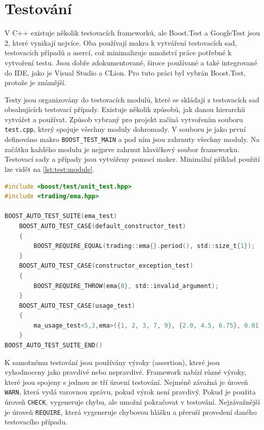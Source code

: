 \chapter{Testování}
V C++ existuje několik testovacích frameworků, ale Boost.Test a GoogleTest jsou 2, které vynikají nejvíce.
Oba používají makra k vytváření testovacích sad, testovacích případů a asercí, což minimalizuje množství práce potřebné k vytvoření testu.
Jsou dobře zdokumentované, široce používané a také integrované do IDE, jako je Visual Studio a CLion.
Pro tuto práci byl vybrán Boost.Test, protože je známější.

Testy jsou organizovány do testovacích modulů, které se skládají z testovacích sad obsahujících testovací případy.
Existuje několik způsobů, jak danou hierarchii vytvářet a používat.
Způsob vybraný pro projekt začíná vytvořením souboru \texttt{test.cpp}, který spojuje všechny moduly dohromady.
V souboru je jako první definováno makro \texttt{BOOST\_TEST\_MAIN} a pod ním jsou zahrnuty všechny moduly.
Na začátku každého modulu je nejprve zahrnut hlavičkový soubor frameworku.
Testovací sady a případy jsou vytvářeny pomocí maker.
Minimální příklad použití lze vidět na \ref{lst:test:module}.

\begin{lstlisting}[caption={~Ukázka testovacího modulu},label={lst:test:module},captionpos=t,abovecaptionskip=-\medskipamount,belowcaptionskip=\medskipamount,language=C]
#include <boost/test/unit_test.hpp>
#include <trading/ema.hpp>

BOOST_AUTO_TEST_SUITE(ema_test)
    BOOST_AUTO_TEST_CASE(default_constructor_test)
    {
        BOOST_REQUIRE_EQUAL(trading::ema{}.period(), std::size_t{1});
    }
    BOOST_AUTO_TEST_CASE(constructor_exception_test)
    {
        BOOST_REQUIRE_THROW(ema{0}, std::invalid_argument);
    }
    BOOST_AUTO_TEST_CASE(usage_test)
    {
        ma_usage_test<5,3,ema>({1, 2, 3, 7, 9}, {2.0, 4.5, 6.75}, 0.01);
    }
BOOST_AUTO_TEST_SUITE_END()
\end{lstlisting}

K samotnému testování jsou používány výroky (assertion), které jsou vyhodnoceny jako pravdivé nebo nepravdivé.
Framework nabízí různé výroky, které jsou spojeny s jednou ze tří úrovní testování.
Nejméně závažná je úroveň \texttt{WARN}, která vydá varovnou zprávu, pokud výrok není pravdivý.
Pokud je použita úroveň \texttt{CHECK}, vygeneruje chybu, ale umožní pokračovat v testování.
Nejzávažnější je úroveň \texttt{REQUIRE}, která vygeneruje chybovou hlášku a přeruší provedení daného testovacího případu.

